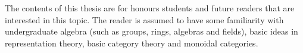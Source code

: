 The contents of this thesis are for honours students and future readers that are interested in this topic. The reader is assumed to have some familiarity with undergraduate algebra (such as groups, rings, algebras and fields), basic ideas in representation theory, basic category theory and monoidal categories.





